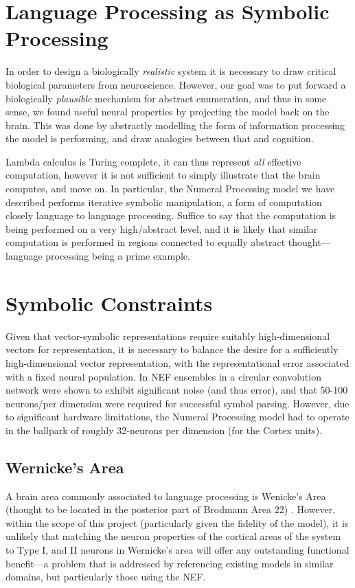 \documentclass{report}
\begin{document}
\section{Language Processing as Symbolic Processing}

In order to design a biologically \emph{realistic} system it is necessary to draw critical biological parameters from neuroscience.
However, our goal was to put forward a biologically \emph{plausible} mechanism for abstract enumeration, and thus in some sense, we found useful neural properties by projecting the model back on the brain.
This was done by abstractly modelling the form of information processing the model is performing, and draw analogies between that and cognition.

Lambda calculus is Turing complete, it can thus represent \emph{all} effective computation, however it is not sufficient to simply illustrate that the brain computes, and move on.
In particular, the Numeral Processing model we have described performs iterative symbolic manipulation, a form of computation closely language to language processing.
Suffice to say that the computation is being performed on a very high/abstract level, and it is likely that similar computation is performed in regions connected to equally abstract thought---language processing being a prime example.

\section{Symbolic Constraints}
Given that vector-symbolic representations require suitably high-dimensional vectors for representation, it is necessary to balance the desire for a sufficiently high-dimensional vector representation, with the representational error associated with a fixed neural population.
In \cite{stewart2014} NEF ensembles in a circular convolution network were shown to exhibit significant noise (and thus error), and that 50-100 neurons/per dimension were required for successful symbol parsing.
However, due to significant hardware limitations, the Numeral Processing model had to operate in the ballpark of roughly 32-neurons per dimension (for the Cortex units).

\subsection{Wernicke\rq{}s Area}
A brain area commonly associated to language processing is Wenicke\rq{}s Area (thought to be located in the posterior part of Brodmann Area 22) \cite{Brogen1976}.
However, within the scope of this project (particularly given the fidelity of the model), it is unlikely that matching the neuron properties of the cortical areas of the system to Type I, and II neurons in Wernicke\rq{}s area will offer any outstanding functional benefit---a problem that is addressed by referencing existing models in similar domains, but particularly those using the NEF.
\end{document}
